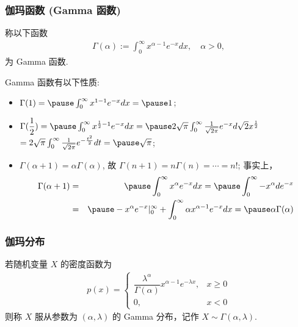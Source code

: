 \begin{frame}
	\frametitle{伽玛函数 (Gamma 函数)}
	\begin{defi}
		称以下函数
		\begin{eqnarray*}
			\Gamma(\alpha):=\int_0^\infty x^{\alpha-1}e^{-x}dx, \quad \alpha>0,
		\end{eqnarray*}
		为 Gamma 函数.
	\end{defi}
	\pause
	Gamma 函数有以下性质:\pause
	\begin{itemize}[<+-|alert@+>]
		\item $\Gamma(1)=\pause \int_0^\infty x^{1-1}e^{-x}dx=\pause 1$;
		\item $\Gamma(\dfrac{1}{2})=\pause \int_0^\infty x^{\frac{1}{2}-1}e^{-x}dx=\pause 2\sqrt{\pi}\int_0^\infty \frac{1}{\sqrt{2\pi}}e^{-x}d\sqrt{2}x^{\frac{1}{2}}$ \pause $=2\sqrt{\pi}\int_0^\infty \frac{1}{\sqrt{2\pi}}e^{-\frac{t^2}{2}}dt=\pause \sqrt{\pi}$;
		\item $\Gamma (\alpha+1)=\alpha\Gamma (\alpha)$, 故 $\Gamma (n+1)=n\Gamma (n)=\cdots =n!$; \pause 事实上，
		      \begin{eqnarray*}
			      \Gamma(\alpha+1)&=&\pause \int_0^\infty x^\alpha e^{-x}dx=\pause \int_0^\infty -x^\alpha de^{-x}\\
			      &=&\pause -x^\alpha e^{-x}|_0^\infty+\int_0^\infty \alpha x^{\alpha-1} e^{-x}dx=\pause \alpha\Gamma(\alpha)
		      \end{eqnarray*}
	\end{itemize}

\end{frame}
\begin{frame}
	\frametitle{伽玛分布}
	\begin{defi}[Gamma 分布]
		若随机变量 $X$ 的密度函数为
		\begin{eqnarray*}
			p(x)=\left\{
			\begin{array}{ll}
				\dfrac{\lambda^\alpha}{\Gamma(\alpha)}x^{\alpha-1}e^{-\lambda x}, & x\ge 0 \\
				0,                                                                & x<0
			\end{array}
			\right.
		\end{eqnarray*}
		则称 $X$ 服从参数为 $(\alpha,\lambda)$ 的 Gamma 分布，记作 $X\sim \Gamma (\alpha,\lambda)$.
	\end{defi}
\end{frame}

